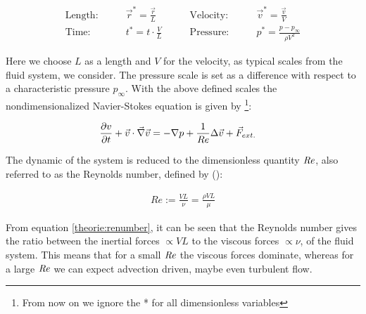 \begin{align}
    \text{Length:}\qquad &  \vec{r}^* = \frac{\vec{r}}{L}  & \qquad \text{Velocity:}\qquad& \vec{v}^* = \frac{\vec{v}}{V}\\
    \text{Time:}  \qquad & t^* = t \cdot \frac{V}{L}      & \qquad  \text{Pressure:}\qquad & p^* = \frac{p - p_\infty}{\rho V^2}
\end{align}

Here we choose $L$ as a length and $V$ for the velocity, as typical scales from the fluid system, we consider.
The pressure scale is set as a difference with respect to a characteristic pressure $p_\infty$.
With the above defined scales the nondimensionalized Navier-Stokes equation is given by \footnote{
From now on we ignore the * for all dimensionless variables }:

\begin{align}
    \pdn[v]{t} + \vec{v} \cdot \vec{\nabla} \vec{v} &= -\nabla p + \frac{1}{Re} \Delta \vec{v} + \vec{F}_{ext.}
\end{align}

The dynamic of the system is reduced to the dimensionless quantity $\Rey$, also referred to as the Reynolds number,
defined by (\citep{Kundu2012}):

\begin{align}
    \label{theorie:renumber}
    Re := \frac{VL}{\nu} = \frac{\rho VL}{\mu}
\end{align}

\newpage

From equation \ref{theorie:renumber}, it can be seen that the Reynolds number gives the ratio between the inertial forces $\propto VL$
to the viscous forces $\propto \nu$, of the fluid system.
This means that for a small $\Rey$ the viscous forces dominate, whereas for a large $\Rey$ we can expect advection driven, maybe even turbulent flow.\\

%
\clearpage

